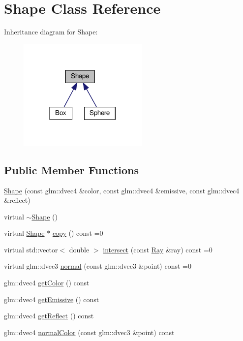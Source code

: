 \hypertarget{class_shape}{}\section{Shape Class Reference}
\label{class_shape}


Inheritance diagram for Shape\+:
\nopagebreak
\begin{figure}[H]
\begin{center}
\leavevmode
\includegraphics[width=180pt]{class_shape__inherit__graph}
\end{center}
\end{figure}
\subsection*{Public Member Functions}
\begin{DoxyCompactItemize}
\item 
\hyperlink{class_shape_ac88bb6ad20b88fd4d3424ef2f13f20ed}{Shape} (const glm\+::dvec4 \&color, const glm\+::dvec4 \&emissive, const glm\+::dvec4 \&reflect)
\item 
virtual \hyperlink{class_shape_ac3b9fc48965274893f25b18aa14ba665}{$\sim$\+Shape} ()
\item 
virtual \hyperlink{class_shape}{Shape} $\ast$ \hyperlink{class_shape_a99f9bc881b17366992a3edf278b105d0}{copy} () const =0
\item 
virtual std\+::vector$<$ double $>$ \hyperlink{class_shape_aa75a11aaba99bddfccf772faa7e6324b}{intersect} (const \hyperlink{class_ray}{Ray} \&ray) const =0
\item 
virtual glm\+::dvec3 \hyperlink{class_shape_a8444ffb396f26bd86c1c11bc6c47a74d}{normal} (const glm\+::dvec3 \&point) const =0
\item 
glm\+::dvec4 \hyperlink{class_shape_aa6568381e79d7ea3329829253601c64b}{get\+Color} () const 
\item 
glm\+::dvec4 \hyperlink{class_shape_a2e655e8d2e561f0373f3195fa18ec2dd}{get\+Emissive} () const 
\item 
glm\+::dvec4 \hyperlink{class_shape_a999c83a1d16cfa3743d4a117c54bfa00}{get\+Reflect} () const 
\item 
glm\+::dvec4 \hyperlink{class_shape_a51fed50eac9fbb4c39bd226e92643051}{normal\+Color} (const glm\+::dvec3 \&point) const 
\end{DoxyCompactItemize}


